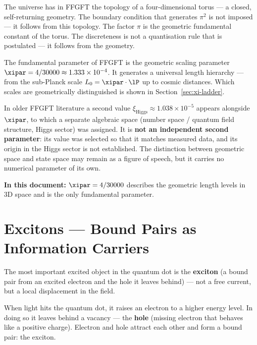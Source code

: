 \begin{foundation}
The universe has in FFGFT the topology of a four-dimensional torus ---
a closed, self-returning geometry.
The boundary condition that generates $\pi^2$ is not imposed ---
it follows from this topology. The factor $\pi$ is the
geometric fundamental constant of the torus. The discreteness is
not a quantisation rule that is postulated --- it follows
from the geometry.

The fundamental parameter of FFGFT is the geometric
scaling parameter $\xipar = 4/30000 \approx 1.333 \times 10^{-4}$.
It generates a universal length hierarchy --- from the
sub-Planck scale $L_0 = \xipar \cdot \lP$ up to cosmic distances.
Which scales are geometrically distinguished is shown in
Section~\ref{sec:xi-ladder}.

\begin{keypoint}
In older FFGFT literature a second value
$\xi_\text{Higgs} \approx 1.038 \times 10^{-5}$ appears alongside $\xipar$, to which a separate
algebraic space (number space / quantum field structure, Higgs sector) was assigned.
It is \textbf{not an independent second parameter}: its value was selected
so that it matches measured data, and its origin in the Higgs sector
is not established. The distinction between geometric space and state space
may remain as a figure of speech, but it carries no numerical parameter
of its own.

\textbf{In this document:} $\xipar = 4/30000$ describes the
geometric length levels in 3D space and is the only fundamental parameter.
\end{keypoint}
\end{foundation}

\section{Excitons --- Bound Pairs as Information Carriers}
\label{sec:excitons}

The most important excited object in the quantum dot is the
\textbf{exciton} (a bound pair from an excited electron
and the hole it leaves behind) ---
not a free current, but a local displacement in the field.

When light hits the quantum dot, it raises an electron
to a higher energy level. In doing so it leaves behind a
vacancy --- the \textbf{hole} (missing electron that behaves
like a positive charge). Electron and hole attract each other
and form a bound pair: the exciton.

